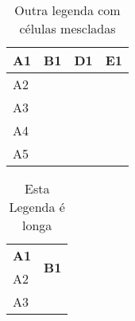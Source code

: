 \documentclass{article}
\begin{document}
\renewcommand{\arraystretch}{2}
\begin{table}[H]
  \centering
  \label{tab:tab4}
  \begin{tabular}{|l|ll|ll|}
  \hline
  A1 & \multicolumn{2}{l|}{B1}  & \multicolumn{1}{l|}{D1}      & E1      \\ \hline
  A2 & \multicolumn{1}{l|}{} &  & \multicolumn{2}{l|}{\multirow{2}{*}{}} \\ \cline{1-3}
  A3 & \multicolumn{1}{l|}{} &  & \multicolumn{2}{l|}{}                  \\ \hline
  A4 & \multicolumn{1}{l|}{} &  & \multicolumn{1}{l|}{}        &         \\ \hline
  A5 & \multicolumn{1}{l|}{} &  & \multicolumn{1}{l|}{}        &         \\ \hline
  \end{tabular}
  \caption[Legenda Maior]{Outra legenda com células mescladas}
\end{table}

\renewcommand{\arraystretch}{1}

\begin{table}[H]
  \centering
  \label{tab:tab5}
  \begin{tabularx}{0.5\textwidth}{|X|X|X|}
    \hline
    \textbf{A1} & \multicolumn{2}{c|}{\multirow{2}{*}{\textbf{B1}}} \\
    \cline{1-1}
    A2          & \multicolumn{2}{l|}{}                             \\ \hline
    A3          &                         &                         \\ \hline
  \end{tabularx}
  \caption[Legenda Curta]{Esta Legenda é longa}
\end{table}

\end{document}

